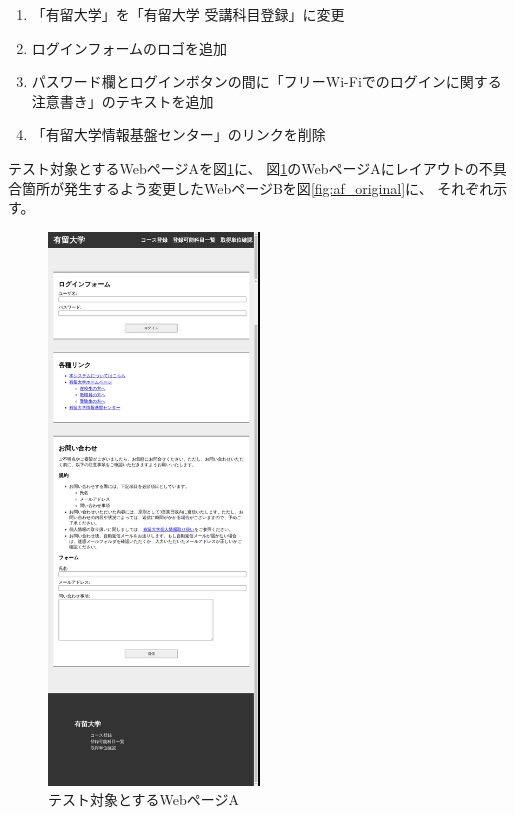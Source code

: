 \begin{enumerate}[label=変更\arabic*., leftmargin=1.8cm]
    \item 「有留大学」を「有留大学 受講科目登録」に変更\label{item: Act1}
    \item ログインフォームのロゴを追加\label{item: Act2}
    \item パスワード欄とログインボタンの間に「フリーWi-Fiでのログインに関する注意書き」のテキストを追加\label{item: Act3}
    \item 「有留大学情報基盤センター」のリンクを削除\label{item: Act4}
\end{enumerate}
テスト対象とするWebページAを図\ref{fig:bf_original}に、
図\ref{fig:bf_original}のWebページAにレイアウトの不具合箇所が発生するよう変更したWebページBを図\ref{fig:af_original}に、
それぞれ示す。
\begin{figure}[htbp]
    \centering
    \includegraphics[width=0.5\textwidth]{image/5/original_png/bf_original.png}
    \caption{テスト対象とするWebページA}
    \label{fig:bf_original}
\end{figure}
